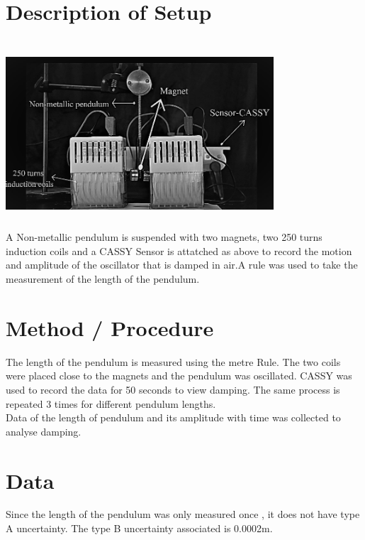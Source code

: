 \section{Description of Setup}
\includegraphics[width=10cm, height=7cm]{figures/fig4.jpeg} \\
 A Non-metallic pendulum is suspended with two magnets, two 250 turns induction coils and a CASSY Sensor is attatched as above to record the motion and amplitude of the oscillator that is damped in air.A rule was used to take the measurement of the length of the pendulum. 


\section{Method / Procedure}

The length of the pendulum is measured using the metre Rule. The two coils were placed close to the magnets and the pendulum was oscillated. CASSY was used to record the data for 50 seconds to view damping. The same process is repeated 3 times for different pendulum lengths. \\
Data of the length of pendulum and its amplitude with time was collected to analyse damping.

\section{Data}

Since the length of the pendulum was only measured once , it does not have type A uncertainty. The type B uncertainty associated is 0.0002m.

